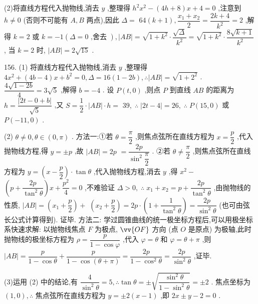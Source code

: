 (2)将直线方程代入抛物线,消去 $y$ ,整理得 ${h}^{2}{x}^{2} - \left( {{4h} + 8}\right) x + 4 = 0$ ,注意到 $h \neq  0$ (否则不可能有 $A,B$ 两点),因此 $\Delta  =$  ${64}\left( {k + 1}\right) ,\dfrac{{x}_{1} + {x}_{2}}{2} = \dfrac{{2k} + 4}{{k}^{2}} = 2$ ,解得 $k = 2$ 或 $k =  - 1\left( {\Delta  = 0\text{ ,舍去 }}\right) ,\left| {AB}\right|  = \sqrt{1 + {k}^{2}} \cdot  \dfrac{\sqrt{\Delta }}{{k}^{2}} = \sqrt{1 + {k}^{2}} \cdot  \dfrac{8\sqrt{k + 1}}{{k}^{2}}$ , 当 $k = 2$ 时, $\left| {AB}\right|  = 2\sqrt{15}$ .

156. (1) 将直线方程代入抛物线,消去 $y$ ,整理得 $4{x}^{2} + \left( {{4b} - 4}\right) x + {b}^{2} = 0,\Delta  = {16}\left( {1 - {2b}}\right) ,\therefore \left| {AB}\right|  = \sqrt{1 + {2}^{2}}$ . $\dfrac{4\sqrt{1 - {2b}}}{4} = 3\sqrt{5}$ ,解得 $b =  - 4$ . 设 $P\left( {t,0}\right)$ ,则点 $P$ 到直线 ${AB}$ 的距离为 $h = \dfrac{\left| 2t - 0 + b\right| }{\sqrt{5}}$ ,又 $S = \dfrac{1}{2} \cdot  \left| {AB}\right|  \cdot  h =$  ${39},\;\therefore \;\left| {{2t} - 4}\right|  = {26},\;\therefore \;P\left( {{15},0}\right)$ 或 $P\left( {-{11},0}\right)$ .

(2) $\theta  \neq  0,\theta  \in  \left( {0,\pi }\right)$ . 方法一:①若 $\theta  = \dfrac{\pi }{2}$ ,则焦点弦所在直线方程为 $x = \dfrac{p}{2}$ ,代入抛物线方程,得 $y =  \pm  p$ ,故 $\left| {AB}\right|  = {2p}$  $= \dfrac{2p}{{\sin }^{2}\dfrac{\pi }{2}}$ . ②若 $\theta  \neq  \dfrac{\pi }{2}$ ,则焦点弦所在直线方程为 $y = \left( {x - \dfrac{p}{2}}\right)  \cdot  \tan \theta$ ,代入抛物线方程,消去 $y$ ,得 ${x}^{2} -$  $\left( {p + \dfrac{2p}{{\tan }^{2}\theta }}\right) x + \dfrac{{p}^{2}}{4} = 0$ ,不难验证 $\Delta  > 0,\;\therefore \;{x}_{1} + {x}_{2} = p + \dfrac{2p}{{\tan }^{2}\theta }$ ,由抛物线的性质, $\left| {AB}\right|  = \left( {{x}_{1} + \dfrac{p}{2}}\right)  +$  $\left( {{x}_{2} + \dfrac{p}{2}}\right)  = {2p} \cdot  \left( {1 + \dfrac{1}{{\tan }^{2}\theta }}\right)  = \dfrac{2p}{{\sin }^{2}\theta }$ (也可由弦长公式计算得到). 证毕. 方法二: 学过圆锥曲线的统一极坐标方程后,可以用极坐标系快速求解: 以抛物线焦点 $F$ 为极点, $\vv{OF}$ 方向 (点 $O$ 是原点) 为极轴,此时抛物线的极坐标方程为 $\rho  = \dfrac{p}{1 - \cos \varphi }$ ,代入 $\varphi  = \theta$ 和 $\varphi  = \theta  + \pi$ ,则 $\left| {AB}\right|  = \dfrac{p}{1 - \cos \theta } + \dfrac{p}{1 - \cos \left( {\theta  + \pi }\right) } = \dfrac{2p}{1 - {\cos }^{2}\theta } = \dfrac{2p}{{\sin }^{2}\theta }$ ,证毕.

(3)运用 (2) 中的结论,有 $\dfrac{4}{{\sin }^{2}\theta } = 5,\therefore \tan \theta  =  \pm  \sqrt{\dfrac{{\sin }^{2}\theta }{1 - {\sin }^{2}\theta }} =  \pm  2$ . 焦点坐标为 $\left( {1,0}\right) ,\therefore$ 焦点弦所在直线方程为 $y =  \pm  2\left( {x - 1}\right)$ ,即 ${2x} \pm  y - 2 = 0$ .


